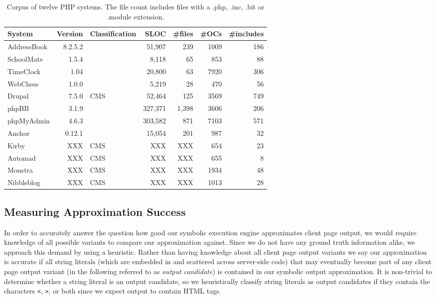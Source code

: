 \documentclass[sigconf]{acmart}
\renewcommand{\tt}[1]{\texttt{#1}}
\begin{document}
\begin{table}[t]
\centering 
	\begin{tabular}{lrp{4cm}rrrr}
	\toprule
	\textbf{System} & \textbf{Version} & \textbf{Classification} & \textbf{SLOC} &
	\textbf{\#files} & \textbf{\#OCs} & \textbf{\#includes}\\
	\midrule
	AddressBook & 8.2.5.2 &  & 51,907 & 239  & 1009 & 186\\
	SchoolMate & 1.5.4 &  & 8,118 & 65  & 853 & 88\\
	TimeClock & 1.04 &  & 20,800 & 63  & 7920 & 306\\
	WebChess & 1.0.0 &  & 5,219 & 28  & 470 & 56\\
	\midrule
	Drupal & 7.5.0 & CMS & 52,464 & 125  & 3569 & 749\\
	phpBB & 3.1.9 &  & 327,371 & 1,398  & 3606 & 206\\
	phpMyAdmin & 4.6.3 &  & 303,582 & 871  & 7103 & 571\\
	\midrule
	Anchor & 0.12.1 &  & 15,054 & 201 & 987 & 32\\
	Kirby & XXX & CMS & XXX & XXX  & 654 & 23\\
	Automad & XXX & CMS & XXX & XXX  & 655 & 8\\
	Monstra & XXX & CMS & XXX & XXX  & 1934 & 48\\
	Nibbleblog & XXX & CMS & XXX & XXX  & 1013 & 28\\
	\bottomrule
	\end{tabular}
	\caption{Corpus of twelve PHP systems. The file count includes files with a .php,
	.inc, .bit or .module extension.}
	\label{corpus}
\end{table}

\subsection{Measuring Approximation Success} \label{heuristic}
In order to accurately answer the question how good our symbolic execution
engine approximates client page output, we would require knowledge of all
possible variants to compare our approximation against. Since we do not have
any ground truth information alike, we approach this demand by using a
heuristic. Rather than having knowledge about all client page output variants
we say our approximation is accurate if all string literals (which are embedded
in and  scattered across server-side code) that may eventually become part of any
client page output variant (in the following referred to as \emph{output
candidate}) is contained in our symbolic output approximation.
It is non-trivial to determine whether a string literal is an output candidate,
so we heuristically classify string literals as output candidates if they
contain the characters \tt{<}, \tt{>}, or both since we expect output to contain
HTML tags.
\end{document}
